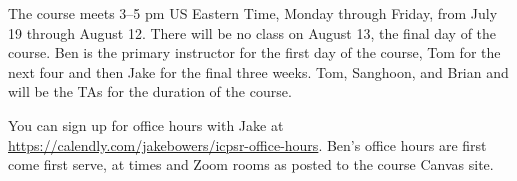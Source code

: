 The course meets 3--5 pm US Eastern Time, Monday through Friday, from July 19 through August
12. There will be no class on August 13, the final day of the course.  Ben is
the primary instructor for the first day of the course, Tom for the next four
and then Jake for the final three weeks. Tom,  Sanghoon, and Brian and will be
the TAs for the duration of the course.

You can sign up for office hours with Jake at
\href{Calendly}{https://calendly.com/jakebowers/icpsr-office-hours}.
Ben's office hours are first come first serve, at times and Zoom rooms
as posted to the course Canvas site. 


